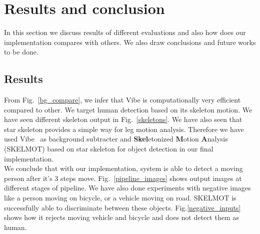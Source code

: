 \chapter{Results and conclusion} %
\label{Chapter4}
\indent In this section we discuss results of different evaluations and
also how does our implementation compares with others. We also draw
conclusions and future works to be done.
\section{Results}
\indent From Fig.~\ref{bg_compare}, we infer that Vibe is
computationally very efficient compared to other.  We target human
detection based on its skeleton motion. We have seen different skeleton
output in Fig.~\ref{skeletons}. We have also seen that star skeleton
provides a simple way for leg motion analysis. Therefore we have used
Vibe~\cite{9} as background subtracter and \textbf{Skel}etonized
\textbf{M}otion \textbf{A}nalysis (SKELMOT) based on star skeleton for
object detection in our final implementation.\\
\indent We conclude that with our implementation, system is able to
detect a moving person after it's 3 steps move.
Fig.~\ref{pipeline_images} shows output images at different stages of
pipeline.
\indent We have also done experiments with negative images like a person
moving on bicycle, or a vehicle moving on road. SKELMOT is successfully able
to discriminate between these objects. Fig.\ref{negative_inputs} shows
how it rejects moving vehicle and bicycle and  does not detect them as
human.

